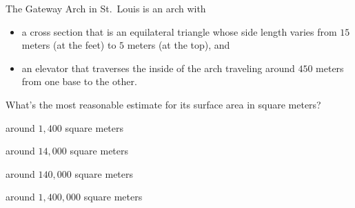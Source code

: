 \documentclass{ximera}
\begin{document}
\begin{exercise}
 The Gateway Arch in St.\ Louis is an arch with
\begin{itemize}
\item a cross section that is an equilateral triangle whose side
  length varies from $15$ meters (at the feet) to $5$ meters (at the
  top), and
\item an elevator that traverses the inside of the arch
  traveling around $450$ meters from one base to the other.
\end{itemize}
What's the most reasonable estimate for its surface area in square meters?
\begin{enumerate}\begin{multicols}{2}
  \item around $1,400$ square meters
  \item around $14,000$ square meters
  \item around $140,000$ square meters
  \item around $1,400,000$ square meters
  \end{multicols}
  \end{enumerate}
\end{exercise}




\end{document}
